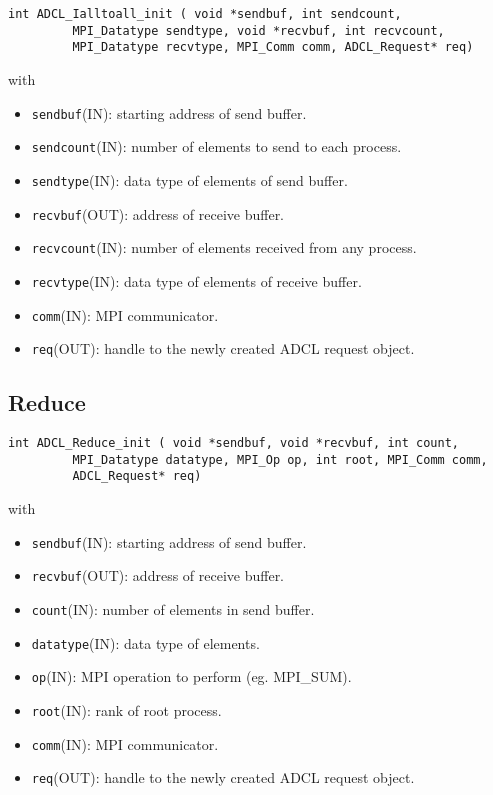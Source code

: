 {{\begin{verbatim}
int ADCL_Ialltoall_init ( void *sendbuf, int sendcount, 
         MPI_Datatype sendtype, void *recvbuf, int recvcount, 
         MPI_Datatype recvtype, MPI_Comm comm, ADCL_Request* req)
\end{verbatim}
with
\begin{itemize}
\item {\tt sendbuf}(IN): starting address of send buffer.
\item {\tt sendcount}(IN): number of elements to send to each process.
\item {\tt sendtype}(IN): data type of elements of send buffer.
\item {\tt recvbuf}(OUT): address of receive buffer.
\item {\tt recvcount}(IN): number of elements received from any process.
\item {\tt recvtype}(IN): data type of elements of receive buffer.
\item {\tt comm}(IN): MPI communicator.
\item {\tt req}(OUT): handle to the newly created ADCL request object.
\end{itemize}

\subsection{Reduce}

\begin{verbatim}
int ADCL_Reduce_init ( void *sendbuf, void *recvbuf, int count, 
         MPI_Datatype datatype, MPI_Op op, int root, MPI_Comm comm, 
         ADCL_Request* req)
\end{verbatim}
with
\begin{itemize}
\item {\tt sendbuf}(IN): starting address of send buffer.
\item {\tt recvbuf}(OUT): address of receive buffer.
\item {\tt count}(IN): number of elements in send buffer.
\item {\tt datatype}(IN): data type of elements.
\item {\tt op}(IN): MPI operation to perform (eg. MPI\_SUM).
\item {\tt root}(IN): rank of root process.
\item {\tt comm}(IN): MPI communicator.
\item {\tt req}(OUT): handle to the newly created ADCL request object.
\end{itemize}

}}
